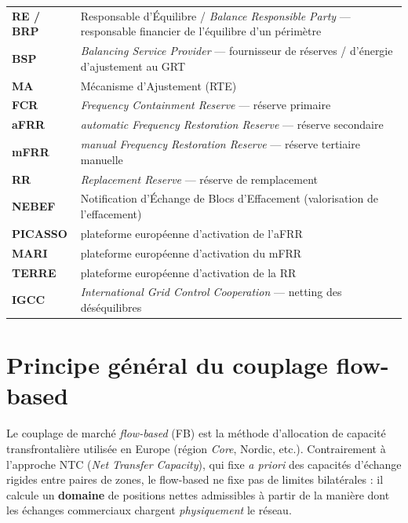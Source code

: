 \documentclass[11pt,a4paper]{article}
\begin{document}
{
\begin{tabular}{@{}p{2.6cm}@{\quad}p{11.5cm}@{}}
\textbf{RE / BRP} & Responsable d'Équilibre / \emph{Balance Responsible Party} — responsable financier de l'équilibre d'un périmètre \\
\textbf{BSP}     & \emph{Balancing Service Provider} — fournisseur de réserves / d'énergie d'ajustement au GRT \\
\textbf{MA}      & Mécanisme d'Ajustement (RTE) \\
\textbf{FCR}     & \emph{Frequency Containment Reserve} — réserve primaire \\
\textbf{aFRR}    & \emph{automatic Frequency Restoration Reserve} — réserve secondaire \\
\textbf{mFRR}    & \emph{manual Frequency Restoration Reserve} — réserve tertiaire manuelle \\
\textbf{RR}      & \emph{Replacement Reserve} — réserve de remplacement \\
\textbf{NEBEF}   & Notification d'Échange de Blocs d'Effacement (valorisation de l'effacement) \\
\textbf{PICASSO} & plateforme européenne d'activation de l'aFRR \\
\textbf{MARI}    & plateforme européenne d'activation du mFRR \\
\textbf{TERRE}   & plateforme européenne d'activation de la RR \\
\textbf{IGCC}    & \emph{International Grid Control Cooperation} — netting des déséquilibres \\
\end{tabular}
}

\section{Principe général du couplage flow-based}

Le couplage de marché \emph{flow-based} (FB) est la méthode d'allocation
de capacité transfrontalière utilisée en Europe (région \emph{Core},
Nordic, etc.). Contrairement à l'approche NTC (\emph{Net Transfer
Capacity}), qui fixe \emph{a priori} des capacités d'échange rigides entre
paires de zones, le flow-based ne fixe pas de limites bilatérales : il
calcule un \textbf{domaine} de positions nettes admissibles à partir de la
manière dont les échanges commerciaux chargent \emph{physiquement} le
réseau.
\end{document}

